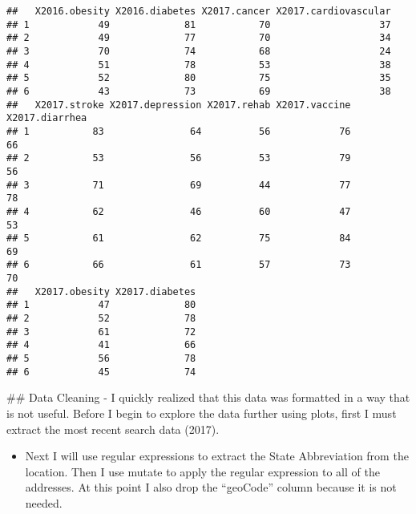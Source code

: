 \documentclass[]{article}
\newenvironment{Shaded}{\begin{snugshade}}{\end{snugshade}}
\newcommand{\KeywordTok}[1]{\textcolor[rgb]{0.13,0.29,0.53}{\textbf{#1}}}
\newcommand{\NormalTok}[1]{#1}
\newcommand{\OperatorTok}[1]{\textcolor[rgb]{0.81,0.36,0.00}{\textbf{#1}}}
\newcommand{\StringTok}[1]{\textcolor[rgb]{0.31,0.60,0.02}{#1}}
\providecommand{\tightlist}{%
  \setlength{\itemsep}{0pt}\setlength{\parskip}{0pt}}
\begin{document}
\begin{verbatim}
##   X2016.obesity X2016.diabetes X2017.cancer X2017.cardiovascular
## 1            49             81           70                   37
## 2            49             77           70                   34
## 3            70             74           68                   24
## 4            51             78           53                   38
## 5            52             80           75                   35
## 6            43             73           69                   38
##   X2017.stroke X2017.depression X2017.rehab X2017.vaccine X2017.diarrhea
## 1           83               64          56            76             66
## 2           53               56          53            79             56
## 3           71               69          44            77             78
## 4           62               46          60            47             53
## 5           61               62          75            84             69
## 6           66               61          57            73             70
##   X2017.obesity X2017.diabetes
## 1            47             80
## 2            52             78
## 3            61             72
## 4            41             66
## 5            56             78
## 6            45             74
\end{verbatim}

\#\# Data Cleaning - I quickly realized that this data was formatted in
a way that is not useful. Before I begin to explore the data further
using plots, first I must extract the most recent search data (2017).

\begin{Shaded}
\end{Shaded}

\begin{itemize}
\tightlist
\item
  Next I will use regular expressions to extract the State Abbreviation
  from the location. Then I use mutate to apply the regular expression
  to all of the addresses. At this point I also drop the ``geoCode''
  column because it is not needed.
\end{itemize}
\end{document}
